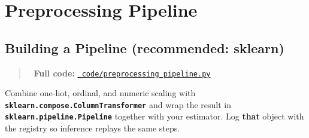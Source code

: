 \documentclass[
  letterpaper,
  DIV=11,
  numbers=noendperiod]{scrreprt}
\begin{document}
\hypertarget{preprocessing-pipeline}{%
\section{Preprocessing Pipeline}\label{preprocessing-pipeline}}

\hypertarget{building-a-pipeline-recommended-sklearn}{%
\subsection{Building a Pipeline (recommended:
sklearn)}\label{building-a-pipeline-recommended-sklearn}}

\begin{quote}
📁 \textbf{Full code:}
\href{_code/preprocessing_pipeline.py}{\texttt{\_code/preprocessing\_pipeline.py}}
\end{quote}

Combine one-hot, ordinal, and numeric scaling with
\textbf{\texttt{sklearn.compose.ColumnTransformer}} and wrap the result
in \textbf{\texttt{sklearn.pipeline.Pipeline}} together with your
estimator. Log \textbf{that} object with the registry so inference
replays the same steps.
\end{document}
